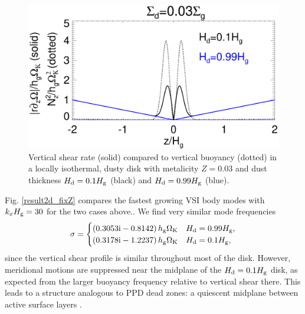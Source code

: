 \begin{figure}
  \includegraphics[width=\linewidth]{figures/compare_vshear_Nz2_fixZ} 
  \caption{Vertical shear rate (solid) compared to vertical buoyancy
    (dotted) in a locally isothermal, dusty disk 
    with metalicity $Z=0.03$ and dust thickness $H_\mathrm{d}=0.1H_\mathrm{g}$
    (black) and $H_\mathrm{d}=0.99H_\mathrm{g}$ (blue). 
    \label{compare_vshear_fixZ}
    }
\end{figure}

Fig. \ref{result2d_fixZ} compares the fastest growing VSI body modes  
with $k_xH_\mathrm{g}=30$ for the two cases above..   
We find very similar mode 
frequencies 
\begin{align*}
  \sigma = \begin{cases}
    \left(0.3053\mathrm{i} - 0.8142\right)h_\mathrm{g}\Omega_{\rm K} & H_\mathrm{d}=0.99H_\mathrm{g}, \\
    \left(0.3178\mathrm{i} - 1.2237\right)h_\mathrm{g}\Omega_{\rm K} & H_\mathrm{d}=0.1H_\mathrm{g},
  \end{cases}
\end{align*}
since the vertical shear profile is similar throughout most of the
disk. However, meridional motions are suppressed near the midplane of
the $H_\mathrm{d}=0.1H_\mathrm{g}$ disk, as expected from the larger buoyancy frequency
relative to vertical shear there. This leads to a structure
analogous to PPD dead zones: a quiescent midplane between active
surface layers \citep{gammie96}.  


